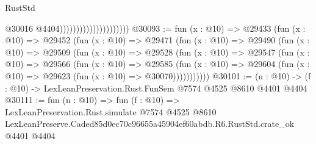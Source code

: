 \begin{lexlean}{RustStd}
\begin{coremodule}
                                              @30016
                                              @4404)))))))))))))))))))))
@30093 := fun (x : @10) =>
  @29433
    (fun (x : @10) =>
    @29452
      (fun (x : @10) =>
      @29471
        (fun (x : @10) =>
        @29490
          (fun (x : @10) =>
          @29509
            (fun (x : @10) =>
            @29528
              (fun (x : @10) =>
              @29547
                (fun (x : @10) =>
                @29566
                  (fun (x : @10) =>
                  @29585
                    (fun (x : @10) =>
                    @29604 (fun (x : @10) => @29623 (fun (x : @10) => @30070)))))))))))
@30101 := (n : @10) -> (f : @10) -> LexLeanPreservation.Rust.FunSem @7574 @4525 @8610 @4401 @4404
@30111 := fun (n : @10) =>
  fun (f : @10) =>
  LexLeanPreservation.Rust.simulate
    @7574
    @4525
    @8610
    LexLeanPreserve.Caded85d0ec70c96655a45904ef60abdb.R6.RustStd.crate_ok
    @4401
    @4404
\end{coremodule}
\end{lexlean}
